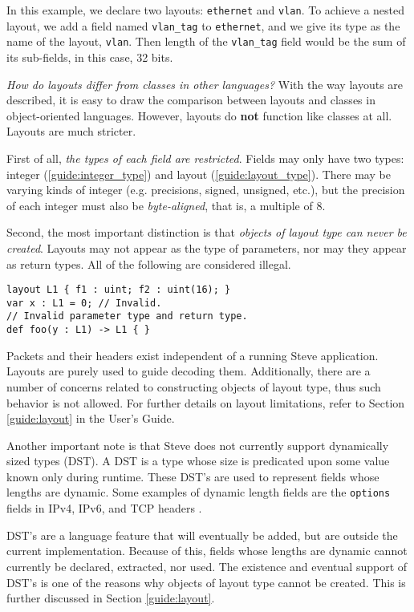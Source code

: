 In this example, we declare two layouts: \texttt{ethernet} and \texttt{vlan}. To achieve a nested layout, we add a field named \texttt{vlan\_tag} to \texttt{ethernet}, and we give its type as the name of the layout, \texttt{vlan}. Then length of the \texttt{vlan\_tag} field would be the sum of its sub-fields, in this case, 32 bits.

\textit{How do layouts differ from classes in other languages?} With the way layouts are described, it is easy to draw the comparison between layouts and classes in object-oriented languages. However, layouts do \textbf{not} function like classes at all. Layouts are much stricter.

First of all, \textit{the types of each field are restricted}. Fields may only have two types: integer (\ref{guide:integer_type}) and layout (\ref{guide:layout_type}). There may be varying kinds of integer (e.g. precisions, signed, unsigned, etc.), but the precision of each integer must also be \textit{byte-aligned}, that is, a multiple of 8. 

Second, the most important distinction is that \textit{objects of layout type can never be created}. Layouts may not appear as the type of parameters, nor may they appear as return types. All of the following are considered illegal.

\begin{codepage}
\begin{lstlisting}
layout L1 { f1 : uint; f2 : uint(16); }
var x : L1 = 0; // Invalid.
// Invalid parameter type and return type.
def foo(y : L1) -> L1 { }
\end{lstlisting}
\end{codepage} 

Packets and their headers exist independent of a running Steve application. Layouts are purely used to guide decoding them. Additionally, there are a number of concerns related to constructing objects of layout type, thus such behavior is not allowed. For further details on layout limitations, refer to Section \ref{guide:layout} in the User's Guide.

Another important note is that Steve does not currently support dynamically sized types (DST). A DST is a type whose size is predicated upon some value known only during runtime. These DST's are used to represent fields whose lengths are dynamic. Some examples of dynamic length fields are the \texttt{options} fields in IPv4, IPv6, and TCP headers \cite{ipv4_std, ipv6_std, tcp_std}.

DST's are a language feature that will eventually be added, but are outside the current implementation. Because of this, fields whose lengths are dynamic cannot currently be declared, extracted, nor used. The existence and eventual support of DST's is one of the reasons why objects of layout type cannot be created. This is further discussed in Section \ref{guide:layout}.


